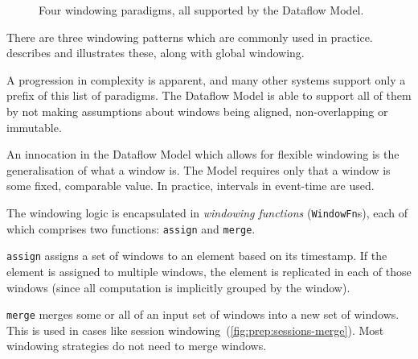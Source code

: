 \begin{figure}
{	}
	\caption{Four windowing paradigms, all supported by the Dataflow Model.}
	\label{fig:prep:window-types}
\end{figure}

There are three windowing patterns which are commonly used in practice.
 describes and illustrates these, along with global windowing.

A progression in complexity is apparent, and many other systems support only a prefix of this list of paradigms.
The Dataflow Model is able to support all of them by not making assumptions about windows being aligned, non-overlapping or immutable.

An innocation in the Dataflow Model which allows for flexible windowing is the generalisation of what a window is.
The Model requires only that a window is some fixed, comparable value.
In practice, intervals in event-time are used.

The windowing logic is encapsulated in \emph{windowing functions} (\verb|WindowFn|s), each of which comprises two functions: \texttt{assign} and \texttt{merge}.

\texttt{assign} assigns a set of windows to an element based on its timestamp.
If the element is assigned to multiple windows, the element is replicated in each of those windows (since all computation is implicitly grouped by the window).

\texttt{merge} merges some or all of an input set of windows into a new set of windows.
This is used in cases like session windowing~(\cref{fig:prep:sessions-merge}).
Most windowing strategies do not need to merge windows.

